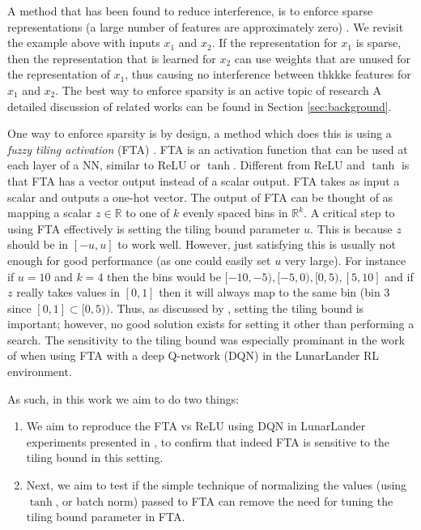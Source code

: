 \documentclass{article}
\newcommand{\RR}{\mathbb{R}}
\begin{document}
A method that has been found to reduce interference, is to enforce sparse representations (a large number of features are approximately zero) \cite[]{liu2019,javed2019,rafati2019learning}.
We revisit the example above with inputs $x_1$ and $x_2$.
If the representation for $x_1$ is sparse, then the representation that is learned for $x_2$ can use weights that are unused for the representation of $x_1$, 
thus causing no interference between thkkke features for $x_1$ and $x_2$.
The best way to enforce sparsity is an active topic of research 
A detailed discussion of related works can be found in Section \ref{sec:background}.

One way to enforce sparsity is by design, a method which does this is using a \textit{fuzzy tiling activation} (FTA) \cite[]{pan2019fuzzy}.
FTA is an activation function that can be used at each layer of a NN, similar to ReLU or $\tanh$.
Different from ReLU and $\tanh$ is that FTA has a vector output instead of a scalar output.
FTA takes as input a scalar and outputs a one-hot vector.
The output of FTA can be thought of as mapping a scalar $z \in \RR$ to one of $k$ evenly spaced bins in $\RR^k$.
A critical step to using FTA effectively is setting the tiling bound parameter $u$.
This is because $z$ should be in $[-u, u]$ to work well. 
However, just satisfying this is usually not enough for good performance (as one could easily set $u$ very large).
For instance if $u = 10$ and $k = 4$ then the bins would be $[-10, -5), [-5, 0), [0, 5), [5, 10]$ 
and if $z$ really takes values in $[0,1]$ then it will always map to the same bin (bin $3$ since $[0, 1] \subset [0, 5))$.
Thus, as discussed by \cite[]{pan2019fuzzy}, setting the tiling bound is important; however, no good solution exists for setting it other than performing a search.
The sensitivity to the tiling bound was especially prominant in the work of \cite[]{pan2019fuzzy} when using FTA with a deep Q-network (DQN) \cite[]{mnih2013playing} in the LunarLander RL environment.

As such, in this work we aim to do two things:
\begin{enumerate}
  \item We aim to reproduce the FTA vs ReLU using DQN in LunarLander experiments presented in \cite[]{pan2019fuzzy}, to confirm that indeed FTA is sensitive to the tiling bound in this setting.
  \item Next, we aim to test if the simple technique of normalizing the values (using $\tanh$, or batch norm) passed to FTA can remove the need for tuning the tiling bound parameter in FTA.
\end{enumerate}
\end{document}
